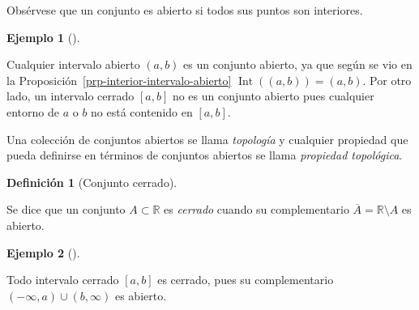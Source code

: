 \documentclass[
  a4paper,
]{scrreport}
\theoremstyle{definition}
\newtheorem{example}{Ejemplo}[chapter]
\theoremstyle{plain}
\theoremstyle{definition}
\newtheorem{definition}{Definición}[chapter]
\theoremstyle{definition}
\theoremstyle{plain}
\theoremstyle{plain}
\theoremstyle{remark}
\begin{document}
\begin{tcolorbox}[enhanced jigsaw, leftrule=.75mm, colbacktitle=quarto-callout-important-color!10!white, toprule=.15mm, opacityback=0, opacitybacktitle=0.6, toptitle=1mm, breakable, bottomtitle=1mm, colframe=quarto-callout-important-color-frame, rightrule=.15mm, titlerule=0mm, title=\textcolor{quarto-callout-important-color}{\faExclamation}\hspace{0.5em}{Importante}, arc=.35mm, left=2mm, bottomrule=.15mm, colback=white, coltitle=black]

Obsérvese que un conjunto es abierto si todos sus puntos son interiores.

\end{tcolorbox}

\begin{example}[]\protect\hypertarget{exm-intervalo-abierto-conjunto-abierto}{}\label{exm-intervalo-abierto-conjunto-abierto}

Cualquier intervalo abierto \((a,b)\) es un conjunto abierto, ya que
según se vio en la Proposición~\ref{prp-interior-intervalo-abierto}
\(\operatorname{Int}((a,b)) = (a,b)\). Por otro lado, un intervalo
cerrado \([a,b]\) no es un conjunto abierto pues cualquier entorno de
\(a\) o \(b\) no está contenido en \([a,b]\).

\end{example}

Una colección de conjuntos abiertos se llama \emph{topología} y
cualquier propiedad que pueda definirse en términos de conjuntos
abiertos se llama \emph{propiedad topológica}.

\begin{definition}[Conjunto
cerrado]\protect\hypertarget{def-conjunto-cerrado}{}\label{def-conjunto-cerrado}

Se dice que un conjunto \(A\subset \mathbb{R}\) es \emph{cerrado} cuando
su complementario \(\overline A =\mathbb{R}\setminus A\) es abierto.

\end{definition}

\begin{example}[]\protect\hypertarget{exm-intervalo-cerrado-conjunto-cerrado}{}\label{exm-intervalo-cerrado-conjunto-cerrado}

Todo intervalo cerrado \([a,b]\) es cerrado, pues su complementario
\((-\infty,a)\cup (b,\infty)\) es abierto.

\end{example}
\end{document}
